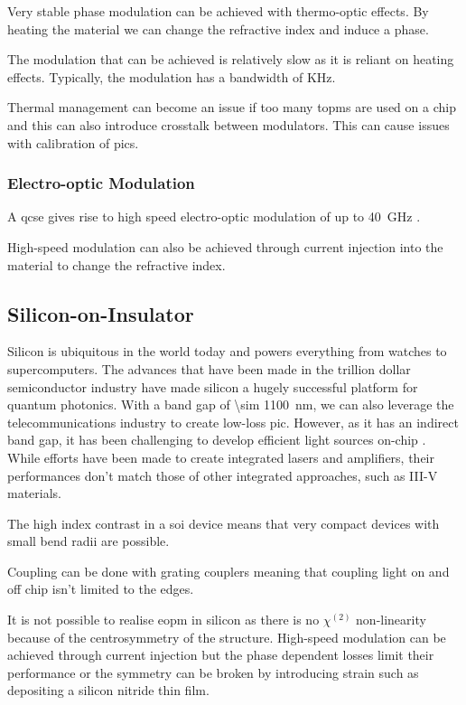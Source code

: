 Very stable phase modulation can be achieved with thermo-optic effects. By heating the material we can change the refractive index and induce a phase.

The modulation that can be achieved is relatively slow as it is reliant on heating effects. Typically, the modulation has a bandwidth of KHz. 

Thermal management can become an issue if too many \acp{topm} are used on a chip and this can also introduce crosstalk between modulators. This can cause issues with calibration of \acp{pic}.

\subsubsection*{Electro-optic Modulation}

A \ac{qcse} gives rise to high speed electro-optic modulation of up to \SI{40}{GHz} \cite{smit2014, jeppix}.

High-speed modulation can also be achieved through current injection into the material to change the refractive index. 

\subsection{Silicon-on-Insulator}

Silicon is ubiquitous in the world today and powers everything from watches to supercomputers. The advances that have been made in the trillion dollar semiconductor industry have made silicon a hugely successful platform for quantum photonics. With a band gap of \SI{\sim 1100}{nm}, we can also leverage the telecommunications industry to create low-loss \acl{pic}. However, as it has an indirect band gap, it has been challenging to develop efficient light sources on-chip \cite{}. While efforts have been made to create integrated lasers and amplifiers, their performances don't match those of other integrated approaches, such as III-V materials.

The high index contrast in a \ac{soi} device means that very compact devices with small bend radii are possible.

Coupling can be done with grating couplers meaning that coupling light on and off chip isn't limited to the edges.

It is not possible to realise \ac{eopm} in silicon as there is no $\chi^{(2)}$ non-linearity because of the centrosymmetry of the structure. High-speed modulation can be achieved through current injection but the phase dependent losses limit their performance \cite{} or the symmetry can be broken by introducing strain such as depositing a silicon nitride thin film.

